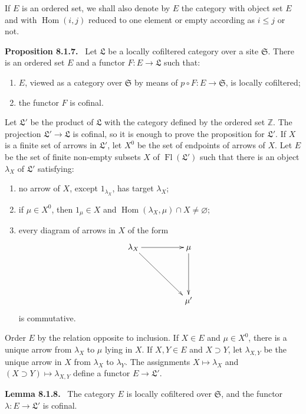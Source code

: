 \documentclass[11pt]{article}
\newcommand{\ZZ}{\mathbb Z}
\newcommand{\Hom}{\operatorname{Hom}}
\newcommand{\Ss}{\mathfrak{S}}
\newcommand{\Ll}{\mathfrak{L}}
\newenvironment{statement}[1]{\par\medskip\noindent\textbf{#1.}\ }{\par\medskip}
\begin{document}
If $E$ is an ordered set, we shall also denote by $E$ the category with object set $E$ and with $\Hom(i,j)$ reduced to one element or empty according as $i\leq j$ or not.

\begin{statement}{Proposition 8.1.7}
Let $\Ll$ be a locally cofiltered category over a site $\Ss$. There is an ordered set $E$ and a functor $F:E\to\Ll$ such that:
\begin{enumerate}[label=(\roman*)]
\item $E$, viewed as a category over $\Ss$ by means of $p\circ F:E\to\Ss$, is locally cofiltered;
\item the functor $F$ is cofinal.
\end{enumerate}
\end{statement}

Let $\Ll'$ be the product of $\Ll$ with the category defined by the ordered set $\ZZ$. The projection $\Ll'\to\Ll$ is cofinal, so it is enough to prove the proposition for $\Ll'$. If $X$ is a finite set of arrows in $\Ll'$, let $X^0$ be the set of endpoints of arrows of $X$. Let $E$ be the set of finite non-empty subsets $X$ of $\operatorname{Fl}(\Ll')$ such that there is an object $\lambda_X$ of $\Ll'$ satisfying:
\begin{enumerate}[label=\alph*)]
\item no arrow of $X$, except $1_{\lambda_X}$, has target $\lambda_X$;
\item if $\mu\in X^0$, then $1_\mu\in X$ and $\Hom(\lambda_X,\mu)\cap X\neq\varnothing$;
\item every diagram of arrows in $X$ of the form
\[
\xymatrix@=1.75cm{\lambda_X\ar[r]\ar[rd]&\mu\ar[d]\\&\mu'}
\]
is commutative.
\end{enumerate}
Order $E$ by the relation opposite to inclusion. If $X\in E$ and $\mu\in X^0$, there is a unique arrow from $\lambda_X$ to $\mu$ lying in $X$. If $X,Y\in E$ and $X\supset Y$, let $\lambda_{X,Y}$ be the unique arrow in $X$ from $\lambda_X$ to $\lambda_Y$. The assignments $X\mapsto\lambda_X$ and $(X\supset Y)\mapsto\lambda_{X,Y}$ define a functor $E\to\Ll'$.

\begin{statement}{Lemma 8.1.8}
The category $E$ is locally cofiltered over $\Ss$, and the functor $\lambda:E\to\Ll'$ is cofinal.
\end{statement}
\end{document}
